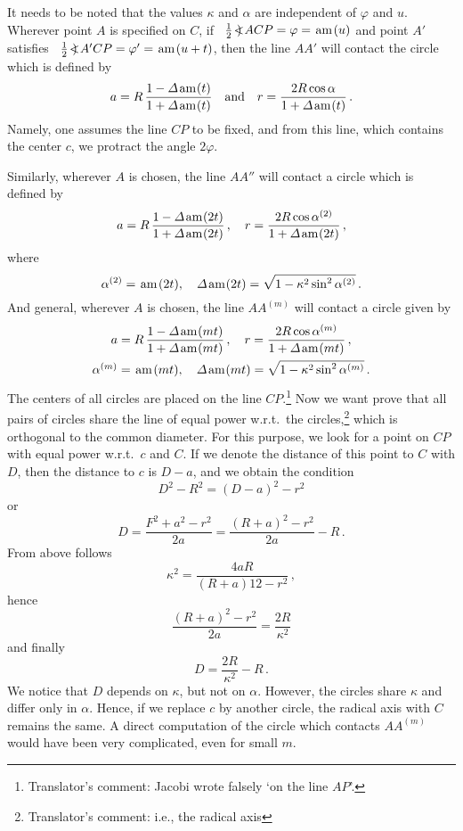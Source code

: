 \medskip\noindent
It needs to be noted that the values $\kappa$ and $\alpha$ are independent of $\varphi$ and $u$.
Wherever point $A$ is specified on $C$, if \ $\frac 12\!<\mskip-10mu)\mskip4mu ACP = \varphi = \mskip 2mu\mbox{am}\mskip 2mu(u)$ and point $A'$ satisfies \ $\frac 12\!<\mskip-10mu)\mskip4mu A'CP = \varphi' = \mskip 2mu\mbox{am}\mskip 2mu(u+t)$, then the line $AA'$ will contact the circle which is defined by
\[  a = R\,\frac{1 - \varDelta\mskip 2mu\mbox{am}\mskip 1mu(t)}{1 + \varDelta\mskip 2mu\mbox{am}\mskip 1mu(t)} \quad\mbox{and}\quad
    r = \frac{2R\cos\alpha}{1 + \varDelta\mskip 2mu\mbox{am}\mskip 1mu(t)}\,.
\]
Namely, one assumes the line $CP$ to be fixed, and from this line, which contains the center $c$, we protract the angle $2\varphi$.

Similarly, wherever $A$ is chosen, the line $AA''$ will contact a circle which is defined by
\[  a = R\,\frac{1 - \varDelta\mskip 2mu\mbox{am}\mskip 1mu(2t)}{1 + \varDelta\mskip 2mu\mbox{am}\mskip 1mu(2t)}\,, \quad
    r = \frac{2R\cos\alpha^{(2)}}{1 + \varDelta\mskip 2mu\mbox{am}\mskip 1mu(2t)}\,,
\]
where
\[  \alpha^{(2)} = \mskip 2mu\mbox{am}\mskip 2mu(2t),\quad 
    \varDelta\mskip 2mu\mbox{am}\mskip 1mu(2t) = \sqrt{1 - \kappa^2\sin^2 \alpha^{(2)}}\,.
\]
And general, wherever $A$ is chosen, the line $AA^{(m)}$ will contact a circle given by
\[ \begin{array}{c}
    a = R\,{\displaystyle\frac{1 - \varDelta\mskip 2mu\mbox{am}\mskip 1mu(mt)}{1 + \varDelta\mskip 2mu\mbox{am}\mskip 1mu(mt)}}\,, \quad
     r = {\displaystyle\frac{2R\cos\alpha^{(m)}}{1 + \varDelta\mskip 2mu\mbox{am}\mskip 1mu(mt)}}\,,
   \\[3.5mm] 
    \alpha^{(m)} = \mskip 2mu\mbox{am}\mskip 2mu(mt),\quad 
     \varDelta\mskip 2mu\mbox{am}\mskip 1mu(mt) = \sqrt{1 - \kappa^2\sin^2 \alpha^{(m)}}\,.
  \end{array}
\]
The centers of all circles are placed on the line $CP$.\footnote{
Translator's comment: Jacobi wrote falsely `on the line $AP$'.} 
Now we want prove that all pairs of circles share the line of equal power w.r.t.\ the circles,\footnote{
Translator's comment: i.e., the radical axis}
 which is orthogonal to the common diameter.   
For this purpose, we look for a point on $CP$ with equal power w.r.t.\ $c$ and $C$.
If we denote the distance of this point to $C$ with $D$, then the distance to $c$ is $D-a$, and we obtain the condition
\[  D^2 - R^2 = (D-a)^2 - r^2
\]
or
\[  D = \frac{F^2 + a^2 - r^2}{2a} = \frac{(R+a)^2 - r^2}{2a} - R\,.
\]
From above follows 
\[  \kappa^2 = \frac{4aR}{(R+a)12 - r^2}\,,
\]
hence
\[  \frac{(R+a)^2 - r^2}{2a} = \frac{2R}{\kappa^2}
\]
and finally
\[  D = \frac{2R}{\kappa^2} - R\,.
\]
We notice that $D$ depends on $\kappa$, but not on $\alpha$.
However, the circles share $\kappa$ and differ only in $\alpha$.
Hence, if we replace $c$ by another circle, the radical axis with $C$ remains the same.
A direct computation of the circle which contacts $AA^{(m)}$ would have been very complicated, even for small $m$.

